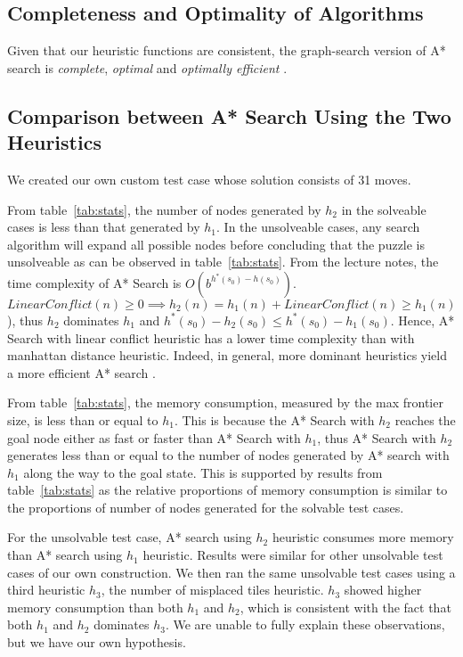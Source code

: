 \documentclass[10pt, a4paper]{article}
\theoremstyle{definition}
\begin{document}
\subsection{Completeness and Optimality of Algorithms}
Given that our heuristic functions are consistent, the graph-search version of A* search is \emph{complete}, \emph{optimal} and \emph{optimally efficient} \cite{russell_norvig_davis_2010}.

\subsection{Comparison between A* Search Using the Two Heuristics}
We created our own custom test case whose solution consists of 31 moves.

From table~\ref{tab:stats}, the number of nodes generated by $h_2$ in the solveable cases is less than that generated by $h_1$.
In the unsolveable cases, any search algorithm will expand all possible nodes before concluding that the puzzle is unsolveable as can be observed in table~\ref{tab:stats}.
From the lecture notes, the time complexity of A* Search is $O(b^{h^*(s_0)-h(s_0)})$. $LinearConflict(n) \geq 0 \implies h_2(n) = h_1(n) + LinearConflict(n) \geq h_1(n)$), thus $h_2$ dominates $h_1$ and $h^*(s_0)-h_2(s_0) \leq h^*(s_0)-h_1(s_0)$.
Hence, A* Search with linear conflict heuristic has a lower time complexity than with manhattan distance heuristic.
Indeed, in general, more dominant heuristics yield a more efficient A* search \cite[p.~104]{russell_norvig_davis_2010}.


From table~\ref{tab:stats}, the memory consumption, measured by the max frontier size, is less than or equal to $h_1$.
This is because the A* Search with $h_2$ reaches the goal node either as fast or faster than A* Search with $h_1$, thus A* Search with $h_2$ generates less than or equal to the number of nodes generated by A* search with $h_1$ along the way to the goal state.
This is supported by results from table~\ref{tab:stats} as the relative proportions of memory consumption is similar to the proportions of number of nodes generated for the solvable test cases.

For the unsolvable test case, A* search using $h_2$ heuristic consumes more memory than A* search using $h_1$ heuristic.
Results were similar for other unsolvable test cases of our own construction.
We then ran the same unsolvable test cases using a third heuristic $h_3$, the number of misplaced tiles heuristic.
$h_3$ showed higher memory consumption than both $h_1$ and $h_2$, which is consistent with the fact that both $h_1$ and $h_2$ dominates $h_3$. We are unable to fully explain these observations, but we have our own hypothesis.
\end{document}
